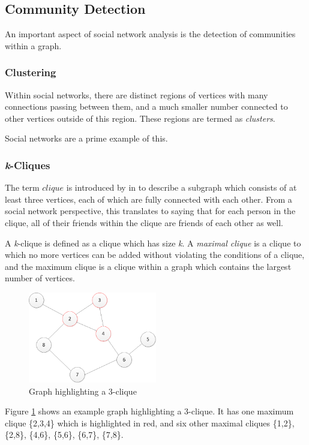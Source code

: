 \subsection{Community Detection}
An important aspect of social network analysis is the detection of communities within a graph.

\subsubsection{Clustering}
Within social networks, there are distinct regions of vertices with many connections passing between them, and a much smaller number connected to other vertices outside of this region. These regions are termed as \emph{clusters}.

Social networks are a prime example of this.

\subsubsection{\emph{k}-Cliques}
The term $clique$ is introduced by \citeauthor{luce49} in \cite{luce49} to describe a subgraph which consists of at least three vertices, each of which are fully connected with each other. From a social network perspective, this translates to saying that for each person in the clique, all of their friends  within the clique are friends of each other as well.

A \emph{k}-clique is defined as a clique which has size \emph{k}. A \emph{maximal clique} is a clique to which no more vertices can be added without violating the conditions of a clique, and the maximum clique is a clique within a graph which contains the largest number of vertices.

\begin{figure}[htbp]
\centering
\includegraphics[width=0.5\textwidth]{./img/clique.png}
\caption{Graph highlighting a 3-clique}
\label{fig:clique}
\end{figure}

Figure \ref{fig:clique} shows an example graph highlighting a 3-clique. It has one maximum clique \{2,3,4\} which is highlighted in red, and six other maximal cliques \{1,2\}, \{2,8\}, \{4,6\}, \{5,6\}, \{6,7\}, \{7,8\}.

